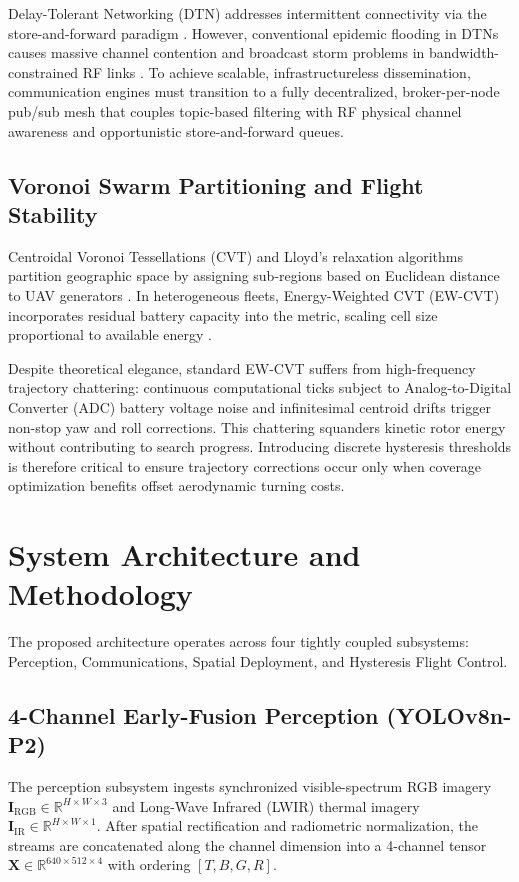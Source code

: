 \documentclass[conference]{IEEEtran}
\begin{document}
Delay-Tolerant Networking (DTN) addresses intermittent connectivity via the store-and-forward paradigm \cite{ref10}. However, conventional epidemic flooding in DTNs causes massive channel contention and broadcast storm problems in bandwidth-constrained RF links \cite{ref15}. To achieve scalable, infrastructureless dissemination, communication engines must transition to a fully decentralized, broker-per-node pub/sub mesh that couples topic-based filtering with RF physical channel awareness and opportunistic store-and-forward queues.

\subsection{Voronoi Swarm Partitioning and Flight Stability}
Centroidal Voronoi Tessellations (CVT) and Lloyd's relaxation algorithms partition geographic space by assigning sub-regions based on Euclidean distance to UAV generators \cite{ref7, ref8}. In heterogeneous fleets, Energy-Weighted CVT (EW-CVT) incorporates residual battery capacity into the metric, scaling cell size proportional to available energy \cite{ref9}.

Despite theoretical elegance, standard EW-CVT suffers from high-frequency trajectory chattering: continuous computational ticks subject to Analog-to-Digital Converter (ADC) battery voltage noise and infinitesimal centroid drifts trigger non-stop yaw and roll corrections. This chattering squanders kinetic rotor energy without contributing to search progress. Introducing discrete hysteresis thresholds is therefore critical to ensure trajectory corrections occur only when coverage optimization benefits offset aerodynamic turning costs.

\section{System Architecture and Methodology}

The proposed architecture operates across four tightly coupled subsystems: Perception, Communications, Spatial Deployment, and Hysteresis Flight Control.

\subsection{4-Channel Early-Fusion Perception (YOLOv8n-P2)}
The perception subsystem ingests synchronized visible-spectrum RGB imagery $\mathbf{I}_{\text{RGB}} \in \mathbb{R}^{H \times W \times 3}$ and Long-Wave Infrared (LWIR) thermal imagery $\mathbf{I}_{\text{IR}} \in \mathbb{R}^{H \times W \times 1}$. After spatial rectification and radiometric normalization, the streams are concatenated along the channel dimension into a 4-channel tensor $\mathbf{X} \in \mathbb{R}^{640 \times 512 \times 4}$ with ordering $[T, B, G, R]$.
\end{document}
